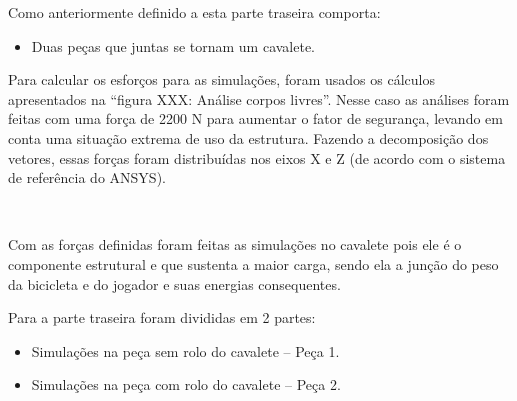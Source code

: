     Como anteriormente definido a esta parte traseira comporta:
    \begin{itemize}
        \item Duas peças que juntas se tornam um cavalete.
    \end{itemize}
    

  
  
    Para calcular os esforços para as simulações, foram usados os cálculos apresentados na “figura XXX: Análise corpos livres”.  Nesse caso as análises foram feitas com uma força de 2200 N para aumentar o fator de segurança, levando em conta uma situação extrema de uso da estrutura. Fazendo a decomposição dos vetores, essas forças foram distribuídas nos eixos X e Z (de acordo com o sistema de referência do ANSYS).
 
 
­
 
    Com as forças definidas foram feitas as simulações no cavalete pois ele é o componente estrutural e que sustenta a maior carga, sendo ela a junção do peso da bicicleta e do jogador e suas energias consequentes.
 
    Para a parte traseira foram divididas em 2 partes:
    \begin{itemize}
        \item Simulações na peça sem rolo do cavalete – Peça 1.
        \item Simulações na peça com rolo do cavalete – Peça 2.
    \end{itemize}
 
 

 
  
 
 
